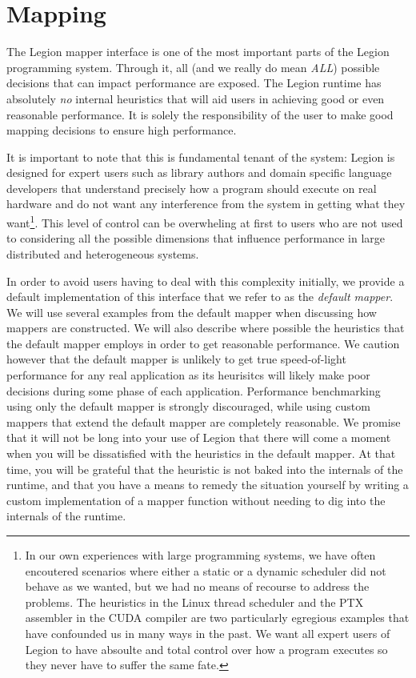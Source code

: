 \chapter{Mapping}
\label{chap:mapping}
The Legion mapper interface is one of the most important parts
of the Legion programming system. Through it, all (and we really
do mean {\em ALL}) possible decisions that can impact performance
are exposed.  The Legion runtime has absolutely {\em no} internal 
heuristics that will aid users in achieving good or even reasonable
performance. It is solely the responsibility of the user to make
good mapping decisions to ensure high performance.

It is important to note that this is fundamental tenant of the system: 
Legion is designed for expert users such as library authors and domain
specific language developers that understand precisely how a program
should execute on real hardware and do not want any interference from
the system in getting what they want\footnote{In our own experiences 
with large programming systems, we have often encoutered scenarios where 
either a static or a dynamic scheduler did not behave as we wanted,
but we had no means of recourse to address the problems. The heuristics in  
the Linux thread scheduler and the PTX assembler in the CUDA compiler 
are two particularly egregious examples that have confounded us in many ways
in the past. We want all expert users of Legion to have absoulte and total 
control over how a program executes so they never have to suffer the same fate.}.
This level of control can be overwheling at first to users who are not used to
considering all the possible dimensions that influence performance in large
distributed and heterogeneous systems.

In order to avoid users having to deal with this complexity initially, we
provide a default implementation of this interface that we refer to as the
{\em default mapper}. We will use several examples from the default mapper
when discussing how mappers are constructed. We will also describe where
possible the heuristics that the default mapper employs in order to get 
reasonable performance. We caution however that the default mapper is unlikely
to get true speed-of-light performance for any real application as its 
heurisitcs will likely make poor decisions during some phase of each 
application. Performance benchmarking using only the default mapper is strongly
discouraged, while using custom mappers that extend the default mapper are
completely reasonable. We promise that it will not be long into your use of 
Legion that there will come a moment when you will be dissatisfied with the 
heuristics in the default mapper. At that time, you will be grateful that the 
heuristic is not baked into the internals of the runtime, and that you have 
a means to remedy the situation yourself by writing a custom implementation of 
a mapper function without needing to dig into the internals of the runtime.

